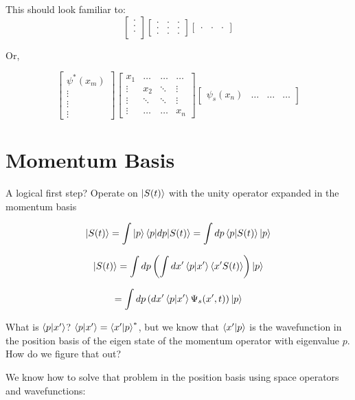 \documentclass{article}
\begin{document}
This should look familiar to:
$$\begin{bmatrix} . \\ . \\ . \\ \end{bmatrix} \begin{bmatrix} . & . & . \\ . & . & . \\ . & . & . \end{bmatrix} \begin{bmatrix} . & . & . \end{bmatrix}$$

Or, 

$$\begin{bmatrix} \psi^* (x_m) \\ \vdots \\ \vdots \\ \vdots \end{bmatrix} \begin{bmatrix} x_1 & \dots & \dots & \dots \\ \vdots & x_2 & \ddots & \vdots \\ \vdots & \ddots & \ddots & \vdots \\ \vdots & \dots & \dots & x_n \end{bmatrix} \begin{bmatrix}  \psi_s (x_n) & \dots & \dots & \dots \end{bmatrix}$$

\section{Momentum Basis}

A logical first step? Operate on $\ket{S(t)}$ with the unity operator expanded in the momentum basis

$$\ket{S(t)} = \int \ket{p} \braket{p|dp|S(t)} = \int dp \braket{p|S(t)} \ket{p}$$

$$\ket{S(t)} = \int dp \left( \int dx' \braket{p | x'} \braket{x' S(t)} \right) \ket{p}$$

$$ = \int dp  \left( dx' \braket{p|x'} \Psi_s(x',t) \right) \ket{p}$$

What is $\braket{p|x'}$? $\braket{p|x'} = \braket{x'|p}^*$, but we know that $\braket{x'|p}$ is the wavefunction in the position basis of the eigen state of the momentum operator with eigenvalue $p$. How do we figure that out? 

We know how to solve that problem in the position basis using space operators and wavefunctions:
\end{document}
